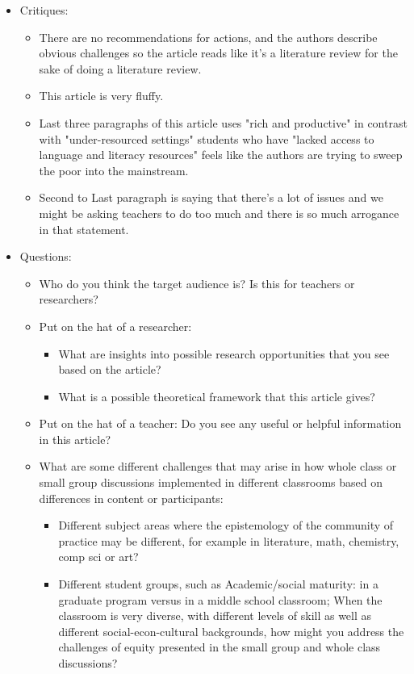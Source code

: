 \documentclass{TC}
\begin{document}
\begin{itemize}
\item Critiques:
	\begin{itemize}
	\item There are no recommendations for actions, and the authors describe obvious challenges so the article reads like it’s a literature review for the sake of doing a literature review.
	\item This article is very fluffy.
	\item Last three paragraphs of this article uses "rich and productive" in contrast with "under-resourced settings" students who have "lacked access to language and literacy resources" feels like the authors are trying to sweep the poor into the mainstream. 
	\item Second to Last paragraph is saying that there's a lot of issues and we might be asking teachers to do too much and there is so much arrogance in that statement.
	\end{itemize}
\item Questions:
	\begin{itemize}
	\item Who do you think the target audience is? Is this for teachers or researchers? 
	\item Put on the hat of a researcher:
		\begin{itemize}
		\item What are insights into possible research opportunities that you see based on the article?
		\item What is a possible theoretical framework that this article gives?
		\end{itemize}
	\item Put on the hat of a teacher: Do you see any useful or helpful information in this article?
	\item What are some different challenges that may arise in how whole class or small group discussions implemented in different classrooms based on differences in content or participants:
		\begin{itemize}
		\item Different subject areas where the epistemology of the community of practice may be different, for example in literature, math, chemistry, comp sci or art?
		\item Different student groups, such as Academic/social maturity: in a graduate program versus in a middle school classroom; When the classroom is very diverse, with different levels of skill as well as different social-econ-cultural backgrounds, how might you address the challenges of equity presented in the small group and whole class discussions?

\end{itemize}
\end{itemize}
\end{itemize}
\end{document}
